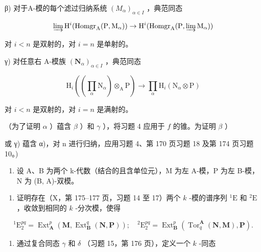 β) 对于A-模的每个滤过归纳系统 \((M_{\alpha})_{\alpha \in I}\) ，典范同态

\[
\varinjlim \mathrm{H} ^ {i} (\operatorname{Homgr} _ {\mathrm{A}} (\mathrm{P}, \mathrm{M} _ {\alpha})) \rightarrow \mathrm{H} ^ {i} (\operatorname{Homgr} _ {\mathrm{A}} (\mathrm{P}, \varinjlim \mathrm{M} _ {\alpha}))
\]

对 \(i < n\) 是双射的，对 \(i = n\) 是单射的。

γ) 对任意右 A-模族 \((\mathbf{N}_{\alpha})_{\alpha\in I}\) ，典范同态

\[
\mathrm{H} _ {i} ((\prod_ {\alpha} \mathrm{N} _ {\alpha}) \otimes_ {\mathrm{A}} \mathrm{P}) \rightarrow \prod_ {\alpha} \mathrm{H} _ {i} (\mathrm{N} _ {\alpha} \otimes \mathrm{P})
\]

对 \(i < n\) 是双射的，对 \(i = n\) 是满射的。

（为了证明 \(\alpha\) ）蕴含 \(\beta\) ）和 \(\gamma\) ），将习题 4 应用于 \(f\) 的锥。为证明 \(\beta\) ）

或 γ) 蕴含 α)，对 n 进行归纳，应用习题 4、第 170 页习题 18 及第 174 页习题 10。)

\begin{enumerate}
\def\labelenumi{\arabic{enumi})}
\setcounter{enumi}{5}
\tightlist
\item
  设 A、B 为两个 k-代数（结合的且含单位元），M 为左 A-模，P 为左 B-模，N 为 (B, A)-双模。
\end{enumerate}

\begin{enumerate}
\def\labelenumi{\alph{enumi})}
\tightlist
\item
  证明存在（X，第 175–177 页，习题 14 至 17）两个 \(k\) -模的谱序列 \({}^{1}\mathrm{E}\) 和 \({}^{2}\mathrm{E}\) ，收敛到相同的 \(k\) -分次模，使得
\end{enumerate}

\[
{ } ^ { 1 } \mathrm{E} _ { 2 } ^ { p q } = \operatorname{Ext} _ { \mathbf { A } } ^ { p } ( \mathbf { M } , \operatorname{Ext} _ { \mathbf { B } } ^ { q } ( \mathbf { N } , \mathbf { P } ) ) ; \quad { } ^ { 2 } \mathrm{E} _ { 2 } ^ { p q } = \operatorname{Ext} _ { \mathbf { B } } ^ { p } ( \operatorname{Tor} _ { q } ^ { \mathbf { A } } ( \mathbf { N } , \mathbf { M } ) , \mathbf { P } ) .
\]

\begin{enumerate}
\def\labelenumi{\alph{enumi})}
\setcounter{enumi}{1}
\tightlist
\item
  通过复合同态 \(\gamma\) 和 \(\delta\) （习题 15，第 176 页），定义一个 \(k\) -同态
\end{enumerate}

